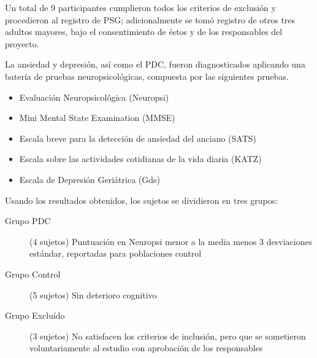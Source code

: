 \documentclass[12pt,a4paper]{mitthesis}
\begin{document}
Un total de 9 participantes cumplieron todos los criterios de exclusi\'on y procedieron al registro 
de PSG; adicionalmente se tom\'o registro de otros tres adultos mayores, bajo
el consentimiento de \'estos y de los responsables del proyecto.

La ansiedad y depresi\'on, as\'i como el PDC, fueron diagnosticados aplicando una bater\'ia de
pruebas neuropsicol\'ogicas, compuesta por las siguientes pruebas. 
%
%
%

\begin{itemize}
\item {Evaluaci\'on Neuropsicol\'ogica (Neuropsi)} \cite{Solis03}
\item {Mini Mental State Examination (MMSE)} \cite{Velasco15}
\item {Escala breve para la detecci\'on de ansiedad del anciano (SATS)} \cite{Vargas11}
\item {Escala sobre las actividades cotidianas de la vida diaria (KATZ)} \cite{Roumec14}
\item {Escala de Depresi\'on Geri\'atrica (Gds)} \cite{Greenberg12,Cuijpers13}
\end{itemize}

Usando los resultados obtenidos, los sujetos se dividieron en tres grupos:
\begin{description}
\item[Grupo PDC] (4 sujetos) Puntuaci\'on en Neuropsi menor a la media menos 3 desviaciones est\'andar, 
reportadas para poblaciones control \cite{Solis03}
\item[Grupo Control] (5 sujetos) Sin deterioro cognitivo
\item[Grupo Exclu\'ido] (3 sujetos) No satisfacen los criterios de inclusi\'on, pero que se 
sometieron voluntariamente al estudio con aprobaci\'on de los responsables
\end{description}
\end{document}
